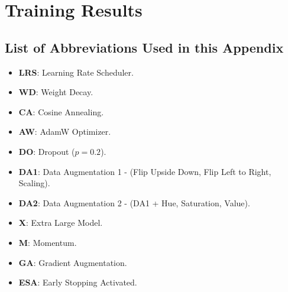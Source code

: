 \chapter{Training Results}\label{app:trainingresults}

\section*{List of Abbreviations Used in this Appendix}
\begin{itemize}
    \item \textbf{LRS}: Learning Rate Scheduler.
    \item \textbf{WD}: Weight Decay.
    \item \textbf{CA}: Cosine Annealing.
    \item \textbf{AW}: AdamW Optimizer.
    \item \textbf{DO}: Dropout (\(p=0.2\)).
    \item \textbf{DA1}: Data Augmentation 1 - (Flip Upside Down, Flip Left to Right, Scaling).
    \item \textbf{DA2}: Data Augmentation 2 - (DA1 + Hue, Saturation, Value).
    \item \textbf{X}: Extra Large Model.
    \item \textbf{M}: Momentum.
    \item \textbf{GA}: Gradient Augmentation.
    \item \textbf{ESA}: Early Stopping Activated.
\end{itemize}

